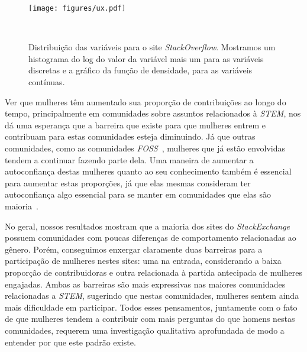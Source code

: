 \begin{figure}
  \centering
  \texttt{[image: figures/ux.pdf]}
  \caption[Distribuição das variáveis para o site \emph{User Experience}]{Distribuição das variáveis para o site \emph{StackOverflow}. Mostramos um histograma do log do valor da variável mais um para as variáveis discretas e a gráfico da função de densidade, para as variáveis contínuas. }~\label{fig:ux}
\end{figure}

Ver que mulheres têm aumentado sua proporção de contribuições ao longo do tempo, principalmente em comunidades sobre assuntos relacionados à \emph{STEM}, nos dá uma esperança que a barreira que existe para que mulheres entrem e contribuam para estas comunidades esteja diminuindo. Já que outras comunidades, como as comunidades \emph{FOSS}~\cite{powell2010gender}, mulheres que já estão envolvidas tendem a continuar fazendo parte dela. Uma maneira de aumentar a autoconfiança destas mulheres quanto ao seu conhecimento também é essencial para aumentar estas proporções, já que elas mesmas consideram ter autoconfiança algo essencial para se manter em comunidades que elas são maioria~\cite{powell2010gender}.

No geral, nossos resultados mostram que a maioria dos sites do \emph{StackExchange} possuem comunidades com poucas diferenças de comportamento relacionadas ao gênero. Porém, conseguimos enxergar claramente duas barreiras para a participação de mulheres nestes sites: uma na entrada, considerando a baixa proporção de contribuidoras e outra relacionada à partida antecipada de mulheres engajadas. Ambas as barreiras são mais expressivas nas maiores comunidades relacionadas a \emph{STEM}, sugerindo que nestas comunidades, mulheres sentem ainda mais dificuldade em participar. Todos esses pensamentos, juntamente com o fato de que mulheres tendem a contribuir com mais perguntas do que homens nestas comunidades, requerem uma investigação qualitativa aprofundada de modo a entender por que este padrão existe.



